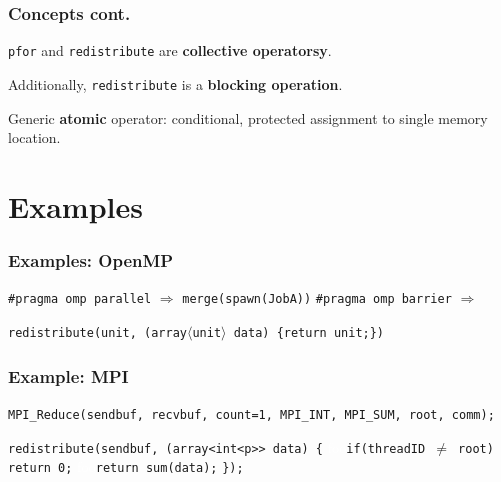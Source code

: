 \documentclass{beamer}
\newcommand\fB[1]{\textcolor{blue!80!black}{\textbf{#1}}}
\begin{document}
\begin{frame}
\frametitle{Concepts cont.}
\texttt{pfor} and \texttt{redistribute} are \fB{collective operatorsy}. 

Additionally, \texttt{redistribute} is a \fB{blocking operation}.
\bigskip

Generic \fB{atomic} operator: conditional, protected assignment to single memory location.
\end{frame}

\section{Examples}
\begin{frame}
\frametitle{Examples: OpenMP}

\texttt{\#pragma omp parallel} $\Rightarrow$ \texttt{merge(spawn(JobA))}
\medskip
\newline\pause
\texttt{\#pragma omp barrier} $\Rightarrow$ 


\texttt{redistribute(unit, (array$\langle$unit$\rangle$ data) \{return unit;\})}
\end{frame}

\begin{frame}
\frametitle{Example: MPI}

\texttt{MPI\_Reduce(sendbuf, recvbuf, count=1, MPI\_INT, MPI\_SUM, root, comm);}
\bigskip

\texttt{redistribute(sendbuf, (array<int<p>> data) \{}
\textcolor{white}{foo}\texttt{if(threadID $\neq$ root) return 0;}
\newline
\textcolor{white}{foo}\texttt{return sum(data);}
\newline
\texttt{\});}
\end{frame}

\end{document}
